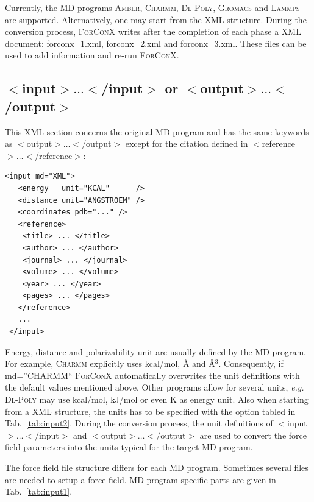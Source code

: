 \documentclass[12pt]{article}
\newcommand{\AMBER}{\textsc{Amber}}
\newcommand{\CHARMM}{\textsc{Charmm}}
\newcommand{\DLPOLY}{\textsc{Dl-Poly}}
\newcommand{\GROMACS}{\textsc{Gromacs}}
\newcommand{\LAMMPS}{\textsc{Lammps}}
\begin{document}
Currently, the MD programs {\AMBER}, {\CHARMM}, {\DLPOLY}, {\GROMACS} and {\LAMMPS}  are supported. Alternatively,
one may start from the XML structure. During the conversion process, \textsc{ForConX} writes after the completion 
of each phase a XML document: forconx\_1.xml, forconx\_2.xml and forconx\_3.xml.
These files can be used to add information and re-run \textsc{ForConX}.

\clearpage{}
\subsection{$<$input$> \ldots <$/input$>$ or $<$output$> \ldots <$/output$>$}
This XML section concerns the original MD program and has the same keywords as $<$output$> \ldots <$/output$>$ except 
for the citation defined in $<$reference$> \ldots <$/reference$>$:
\begin{lstlisting}[basicstyle=\linespread{1.1}\ttfamily]
<input md="XML">
   <energy   unit="KCAL"      />
   <distance unit="ANGSTROEM" />
   <coordinates pdb="..." />
   <reference>
    <title> ... </title>
    <author> ... </author>
    <journal> ... </journal>
    <volume> ... </volume>
    <year> ... </year>
    <pages> ... </pages>
   </reference>
   ...
 </input>
\end{lstlisting}
Energy, distance and polarizability unit are usually defined by the MD program. For example, {\CHARMM} explicitly
uses kcal/mol, {\AA} and {\AA$^3$}. Consequently, if md=''CHARMM`` \textsc{ForConX} automatically overwrites
the unit definitions with the default values mentioned above.
Other programs allow for several units, \textit{e.g.} {\DLPOLY} may use kcal/mol, kJ/mol or even K as energy unit.
Also when starting from a XML structure, the units has to be specified with the option tabled in Tab.~\ref{tab:input2}.
During the conversion process, the unit definitions of $<$input$> \ldots <$/input$>$ and $<$output$> \ldots <$/output$>$    
are used to convert the force field parameters into the units typical for the target MD program.

The force field file structure differs for each MD program. Sometimes several files are needed to setup a
force field. MD program specific parts are given in Tab.~\ref{tab:input1}.
\end{document}
